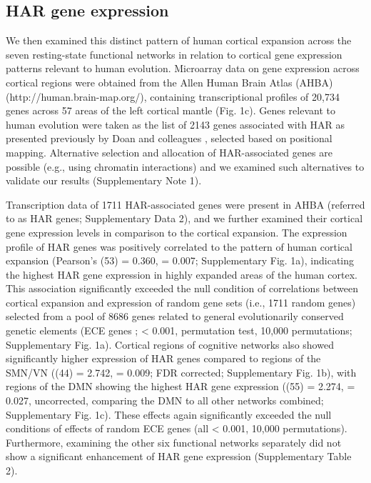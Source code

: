 \begin{refsection}
\subsection*{HAR gene expression}
We then examined this distinct pattern of human cortical expansion across the seven resting-state functional networks in relation to cortical gene expression patterns relevant to human evolution. Microarray data on gene expression across cortical regions were obtained from the Allen Human Brain Atlas (AHBA) (http://human.brain-map.org/), containing transcriptional profiles of 20,734 genes across 57 areas of the left cortical mantle (Fig. 1c). Genes relevant to human evolution were taken as the list of 2143 genes associated with HAR as presented previously by Doan and colleagues \citep{doan2016mutations}, selected based on positional mapping. Alternative selection and allocation of HAR-associated genes are possible (e.g., using chromatin interactions) and we examined such alternatives to validate our results (Supplementary Note 1).

Transcription data of 1711 HAR-associated genes were present in AHBA (referred to as HAR genes; Supplementary Data 2), and we further examined their cortical gene expression levels in comparison to the cortical expansion. The expression profile of HAR genes was positively correlated to the pattern of human cortical expansion (Pearson's \rvaldf(53) = 0.360, \pval = 0.007; Supplementary Fig. 1a), indicating the highest HAR gene expression in highly expanded areas of the human cortex. This association significantly exceeded the null condition of correlations between cortical expansion and expression of random gene sets (i.e., 1711 random genes) selected from a pool of 8686 genes related to general evolutionarily conserved genetic elements (ECE genes \citep{lindblad2011high}; \pval < 0.001, permutation test, 10,000 permutations; Supplementary Fig. 1a). Cortical regions of cognitive networks also showed significantly higher expression of HAR genes compared to regions of the SMN/VN (\tvaldf(44) = 2.742, \pval = 0.009; FDR corrected; Supplementary Fig. 1b), with regions of the DMN showing the highest HAR gene expression (\tvaldf(55) = 2.274, \pval = 0.027, uncorrected, comparing the DMN to all other networks combined; Supplementary Fig. 1c). These effects again significantly exceeded the null conditions of effects of random ECE genes (all \pval < 0.001, 10,000 permutations). Furthermore, examining the other six functional networks separately did not show a significant enhancement of HAR gene expression (Supplementary Table 2).


\end{refsection}

